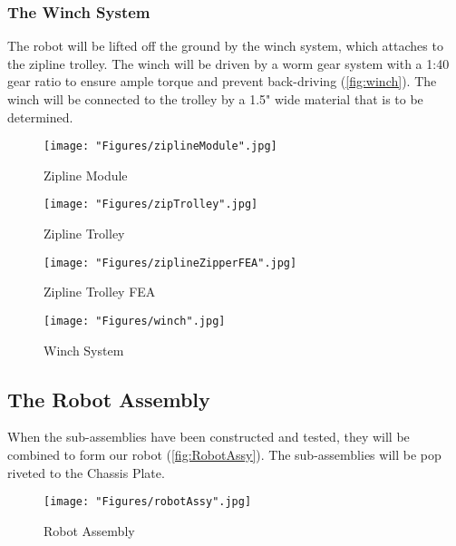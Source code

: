 \documentclass[11pt, oneside]{article} %
\begin{document}
		\subsubsection{The Winch System}
		The robot will be lifted off the ground by the winch system, which attaches to the zipline trolley. The winch will be driven by a worm gear system with a 1:40 gear ratio to ensure ample torque and prevent back-driving (\autoref{fig:winch}). The winch will be connected to the trolley by a 1.5" wide material that is to be determined.
		
		\begin{figure}[h]
			\centering
			\begin{minipage}[t]{.5\textwidth}
				\centering
				\texttt{[image: "Figures/ziplineModule".jpg]}
				\caption[Zipline Module]{Zipline Module}
				\label{fig:zipModule}
			\end{minipage}%
			\begin{minipage}[t]{.5\textwidth}
				\centering
				\texttt{[image: "Figures/zipTrolley".jpg]}
				\caption[Zipline Trolley]{Zipline Trolley}
				\label{fig:zipTrolley}
			\end{minipage}
		\end{figure}	
		
		\begin{figure}[h]
			\centering
			\begin{minipage}[t]{.5\textwidth}
				\centering
				\texttt{[image: "Figures/ziplineZipperFEA".jpg]}
				\caption[Zipline Trolley FEA]{Zipline Trolley FEA}
				\label{fig:zipFEA}
			\end{minipage}%
			\begin{minipage}[t]{.5\textwidth}
				\centering
				\texttt{[image: "Figures/winch".jpg]}
				\caption[WinchSystem]{Winch System}
				\label{fig:winch}
			\end{minipage}
		\end{figure}
	
	\newpage
	\subsection{The Robot Assembly}
	When the sub-assemblies have been constructed and tested, they will be combined to form our robot (\autoref{fig:RobotAssy}). The sub-assemblies will be pop riveted to the Chassis Plate.
	
	\begin{figure}[h]
		\centering
		\texttt{[image: "Figures/robotAssy".jpg]}
		\caption[Robot Assembly]{Robot Assembly}
		\label{fig:RobotAssy}
	\end{figure}
	
\end{document}
